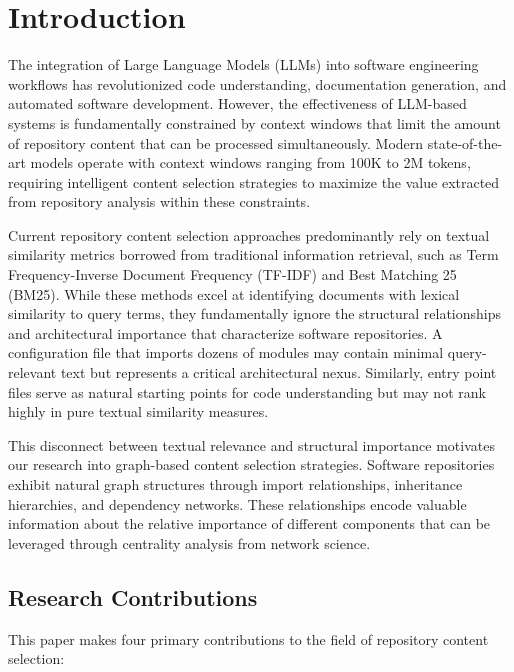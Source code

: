 \documentclass[conference]{IEEEtran}
\begin{document}
\section{Introduction}

The integration of Large Language Models (LLMs) into software engineering workflows has revolutionized code understanding, documentation generation, and automated software development. However, the effectiveness of LLM-based systems is fundamentally constrained by context windows that limit the amount of repository content that can be processed simultaneously. Modern state-of-the-art models operate with context windows ranging from 100K to 2M tokens, requiring intelligent content selection strategies to maximize the value extracted from repository analysis within these constraints.

Current repository content selection approaches predominantly rely on textual similarity metrics borrowed from traditional information retrieval, such as Term Frequency-Inverse Document Frequency (TF-IDF) and Best Matching 25 (BM25). While these methods excel at identifying documents with lexical similarity to query terms, they fundamentally ignore the structural relationships and architectural importance that characterize software repositories. A configuration file that imports dozens of modules may contain minimal query-relevant text but represents a critical architectural nexus. Similarly, entry point files serve as natural starting points for code understanding but may not rank highly in pure textual similarity measures.

This disconnect between textual relevance and structural importance motivates our research into graph-based content selection strategies. Software repositories exhibit natural graph structures through import relationships, inheritance hierarchies, and dependency networks. These relationships encode valuable information about the relative importance of different components that can be leveraged through centrality analysis from network science.

\subsection{Research Contributions}

This paper makes four primary contributions to the field of repository content selection:
\end{document}
